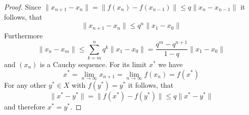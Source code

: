 \begin{proof}
Since \( \| x_{n+1} - x_n\| =\| f(x_n) - f(x_{n-1})\| \le q\| x_n - x_{n-1}\| \) it follows, that
\[ 
    \| x_{n+1} - x_n\| \le q^n  \|x_1 - x_0\| 
\] 
Furthermore
\[ 
    \| x_n - x_m\| \le \sum_{k=m}^n q^k \|x_1 - x_0\| = \frac{q^m - q^{n+1}}{1 - q} \|x_1 - x_0\| 
\] 
and \( (x_n) \) is a Cauchy sequence. For its limit \( x^* \) we have
\[ 
   x^* = \lim_{n\to\infty} x_{n+1} = \lim_{n\to\infty} f(x_n) = f(x^*)
\] 
For any other \( y^* \in X \) with \( f(y^*) = y^* \) it follows, that
\[
    \|x^* - y^*\| = \|f(x^*) - f(y^*)\| \le q \|x^* - y^*\|
\]
and therefore \( x^* = y^*\).

\end{proof}
\bigskip

